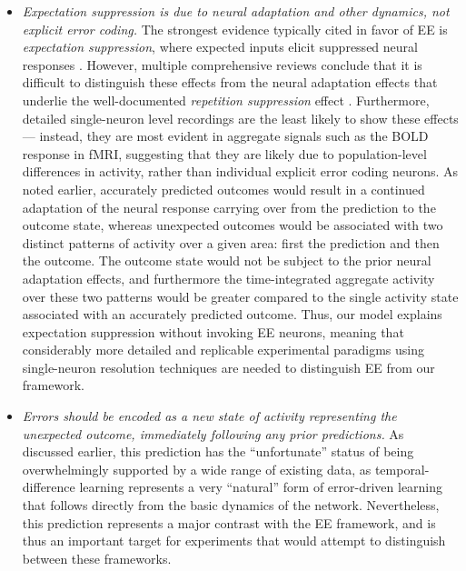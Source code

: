 \documentclass[11pt,twoside]{article}
\newif\myifpdf
\begin{document}
\begin{itemize}
	\item \emph{Expectation suppression is due to neural adaptation and other dynamics, not explicit error coding.}  The strongest evidence typically cited in favor of EE is \emph{expectation suppression}, where expected inputs elicit suppressed neural responses \cite{SummerfieldTrittschuhMontiEtAl08,TodorovicEdeMarisEtAl11,MeyerOlson11,BastosUsreyAdamsEtAl12}.  However,  multiple comprehensive reviews conclude that it is difficult to distinguish these effects from the neural adaptation effects that underlie the well-documented \emph{repetition suppression} effect \cite{WalshMcGovernClarkEtAl20,VinkenVogels17,KokLange15,KokJeheedeLange12,SummerfieldEgner09,LeeMumford03}.  Furthermore, detailed single-neuron level recordings are the least likely to show these effects --- instead, they are most evident in aggregate signals such as the BOLD response in fMRI, suggesting that they are likely due to population-level differences in activity, rather than individual explicit error coding neurons.  As noted earlier, accurately predicted outcomes would result in a continued adaptation of the neural response carrying over from the prediction to the outcome state, whereas unexpected outcomes would be associated with two distinct patterns of activity over a given area: first the prediction and then the outcome.  The outcome state would not be subject to the prior neural adaptation effects, and furthermore the time-integrated aggregate activity over these two patterns would be greater compared to the single activity state associated with an accurately predicted outcome.  Thus, our model explains expectation suppression without invoking EE neurons, meaning that considerably more detailed and replicable experimental paradigms using single-neuron resolution techniques are needed to distinguish EE from our framework.
	\item \emph{Errors should be encoded as a new state of activity representing the unexpected outcome, immediately following any prior predictions.}  As discussed earlier, this prediction has the ``unfortunate'' status of being overwhelmingly supported by a wide range of existing data, as temporal-difference learning represents a very ``natural'' form of error-driven learning that follows directly from the basic dynamics of the network.  Nevertheless, this prediction represents a major contrast with the EE framework, and is thus an important target for experiments that would attempt to distinguish between these frameworks.
\end{itemize}
\end{document}
